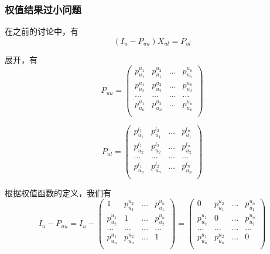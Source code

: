 \documentclass[notheorems, UTF8]{ctexbeamer}
\begin{document}
\begin{frame}
\frametitle{权值结果过小问题}
在之前的讨论中，有
\begin{displaymath}
(I_u - P_{uu})X_{ul} = P_{ul}
\end{displaymath}

展开，有
\begin{displaymath}
P_{uu} = \left(
\begin{array}{cccc}
p_{u_1}^{u_1} & p_{u_1}^{u_2} & \ldots & p_{u_1}^{u_n}  \\
p_{u_2}^{u_1} & p_{u_2}^{u_2} & \ldots & p_{u_2}^{u_n}  \\
\ldots & \ldots & \ldots & \ldots \\
p_{u_n}^{u_1} & p_{u_n}^{u_2} & \ldots & p_{u_n}^{u_n}  \\
\end{array}
\right)
\end{displaymath}

\begin{displaymath}
P_{ul} = \left(
\begin{array}{cccc}
p_{u_1}^{l_1} & p_{u_1}^{l_2} & \ldots & p_{u_1}^{l_n}  \\
p_{u_2}^{l_1} & p_{u_2}^{l_2} & \ldots & p_{u_2}^{l_n}  \\
\ldots & \ldots & \ldots & \ldots \\
p_{u_n}^{l_1} & p_{u_n}^{l_2} & \ldots & p_{u_n}^{l_n}  \\
\end{array}
\right)
\end{displaymath}

根据权值函数的定义，我们有
\begin{displaymath}
I_u - P_{uu} = I_u - \left(
\begin{array}{cccc}
1 & p_{u_1}^{u_2} & \ldots & p_{u_1}^{u_n}  \\
p_{u_2}^{u_1} & 1 & \ldots & p_{u_2}^{u_n}  \\
\ldots & \ldots & \ldots & \ldots \\
p_{u_n}^{u_1} & p_{u_n}^{u_2} & \ldots & 1  \\
\end{array}
\right) = \left(
\begin{array}{cccc}
0 & p_{u_1}^{u_2} & \ldots & p_{u_1}^{u_n}  \\
p_{u_2}^{u_1} & 0 & \ldots & p_{u_2}^{u_n}  \\
\ldots & \ldots & \ldots & \ldots \\
p_{u_n}^{u_1} & p_{u_n}^{u_2} & \ldots & 0  \\
\end{array}
\right)
\end{displaymath}
\end{frame}
\end{document}

